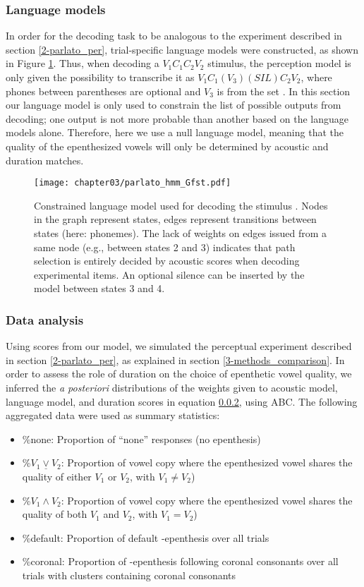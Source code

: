 \subsubsection{Language models}
In order for the decoding task to be analogous to the experiment described in section \ref{2-parlato_per}, trial-specific language models were constructed, as shown in Figure \ref{fig:parlato_G}. Thus, when decoding a $V_{1}C_{1}C_{2}V_{2}$ stimulus, the perception model is only given the possibility to transcribe it as $V_{1}C_{1}(V_{3})(SIL)C_{2}V_{2}$, where phones between parentheses are optional and $V_{3}$ is from the set . In this section our language model is only used to constrain the list of possible outputs from decoding; one output is not more probable than another based on the language models alone. Therefore, here we use a null language model, meaning that the quality of the epenthesized vowels will only be determined by acoustic and duration matches.

\begin{figure}[htb]
\centering
\texttt{[image: chapter03/parlato\_hmm\_Gfst.pdf]}
\caption{Constrained language model used for decoding the stimulus . Nodes in the graph represent states, edges represent transitions between states (here: phonemes). The lack of weights on edges issued from a same node (e.g., between states 2 and 3) indicates that path selection is entirely decided by acoustic scores when decoding experimental items. An optional silence can be inserted by the model between states 3 and 4.}
\label{fig:parlato_G}
\end{figure}

\subsubsection{Data analysis}
Using scores from our model, we simulated the perceptual experiment described in section \ref{2-parlato_per}, as explained in section \ref{3-methods_comparison}. In order to assess the role of duration on the choice of epenthetic vowel quality, we inferred the \textit{a posteriori} distributions of the weights given to acoustic model, language model, and duration scores in {\color{red}equation \ref{}}, using ABC. The following aggregated data were used as summary statistics:

\begin{itemize}
\item \%none: Proportion of ``none'' responses (no epenthesis)
\item \%$V_{1}\underline{\vee}V_{2}$: Proportion of vowel copy where the epenthesized vowel shares the quality of either $V_{1}$ or $V_{2}$, with $V_{1} \neq V_{2}$)
\item \%$V_{1}\land V_{2}$: Proportion of vowel copy where the epenthesized vowel shares the quality of both $V_{1}$ and $V_{2}$, with $V_{1} = V_{2}$)
\item \%default: Proportion of default -epenthesis over all trials
  \item \%coronal: Proportion of -epenthesis following coronal consonants over all trials with clusters containing coronal consonants 
\end{itemize}  
